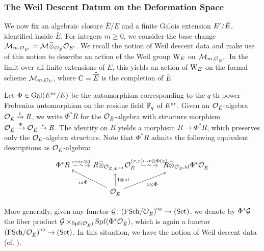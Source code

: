 \documentclass[../main.tex]{subfiles}
\begin{document}

\subsubsection{The Weil Descent Datum on the Deformation Space} %
\label{ssub:The Weil Descent Datum}
We now fix an algebraic closure
$\bar E/E$ and a finite Galois extension $E'/{\breve {E}}$, identified inside $\bar E$. 
For integers $m \geq 0$, we consider the base change $\mathcal{M}_{m, \mathcal{O}_{{E'}}} = \mathcal{M}
\widehat \otimes_{\mathcal{O}_{\breve {E}}} \mathcal{O}_{{E'}}$. 
We recall the notion of Weil descent data and make use of this notion to describe
an action of the Weil group $\mathrm W_E$ on $\mathcal{M}_{m, \mathcal{O}_{{E'}}}$. In the 
limit over all finite extensions of $E$, this yields an action of $\mathrm W_E$ on the
formal scheme $\mathcal{M}_{m, \mathcal{O}_{{{\mathrm{C}}}}}$, where ${\mathrm{C}} = \widehat{\overline E}$  is the completion
of $\bar E$.

Let $\Phi \in \operatorname{Gal}(E^{\mathrm{nr}} / E)$ be the automorphism corresponding to the
$q$-th power Frobenius automorphism on the residue field ${\overline {\mathbb{F}}_q}$ of $E^{\mathrm{nr}}$. Given
an $\mathcal{O}_{\breve {E}}$-algebra $\mathcal{O}_{\breve {E}} \xrightarrow{i} R$, we write $\Phi^*R$ for the 
$\mathcal{O}_{\breve {E}}$-algebra with structure morphism $\mathcal{O}_{\breve {E}} \xrightarrow{\Phi} \mathcal{O}_{\breve {E}} \xrightarrow{i} R$.
The identity on $R$ yields a morphism $R \to \Phi^* R$, which preserves only the 
$\mathcal{O}_E$-algebra structure. Note that $\Phi^* R$ admits the following equivalent
descriptions as $\mathcal{O}_{\breve {E}}$-algebra:
\begin{equation}\label{eq:PhiRDescription}
\begin{tikzcd}[ampersand replacement=\&]
	{\Phi^*R} \& {R \cotimes_{\cO_{\br E, \Phi^{-1}}}\cO_{\br E} \ } \& {\ R \cotimes_{\cO_{\br E}, \id} \Phi^*\cO_{\br E}} \\
	\& {\cO_{\br E}}
	\arrow["{r \mapsto r \otimes 1}", draw=none, from=1-1, to=1-2]
	\arrow["\sim"{description}, from=1-1, to=1-2]
	\arrow["{(r,x) \mapsto r \otimes\Phi(x)}", draw=none, from=1-2, to=1-3]
	\arrow["\sim"{description}, from=1-2, to=1-3]
	\arrow["{i \circ \Phi}", from=2-2, to=1-1]
	\arrow["{1 \otimes \id}"', from=2-2, to=1-2]
	\arrow["{1 \otimes \Phi}"', from=2-2, to=1-3]
\end{tikzcd}
\end{equation}

More generally, given any functor $\mathcal{G} \colon {(\mathrm{FSch}/{\mathcal{O}_{\breve {E}}})}^{\mathrm{op}} \to
{(\mathrm{Set})}$, we denote by
$\Phi^* \mathcal{G}$ the fiber product $\mathcal{G} \times_{\operatorname{Spf}(\mathcal{O}_{\breve {E}})} \operatorname{Spf}(\Phi^*
\mathcal{O}_{\breve {E}})$, which is again a functor ${(\mathrm{FSch}/{\mathcal{O}_{\breve {E}}})}^{\mathrm{op}} \to {(\mathrm{Set})}$.
In this situation, we have the notion of Weil descent data
(cf. \cite[Definition 3.45]{rapoport1996period}).
\end{document}
